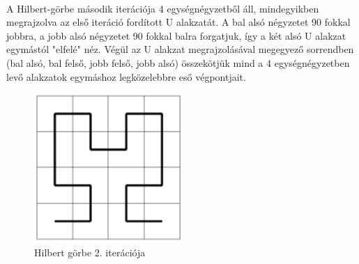 \\A Hilbert-görbe második iterációja 4 egységnégyzetből áll, mindegyikben megrajzolva az első iteráció fordított U alakzatát. A bal alsó négyzetet 90 fokkal jobbra, a jobb alsó négyzetet 90 fokkal balra forgatjuk, így a két alsó U alakzat egymástól "elfelé" néz. Végül az U alakzat megrajzolásával megegyező sorrendben (bal alsó, bal felső, jobb felső, jobb alsó) összekötjük mind a 4 egységnégyzetben levő alakzatok egymáshoz legközelebbre eső végpontjait.
\begin{figure}[!ht]
	\begin{center}
	\includegraphics[width=0.5\textwidth]{img/HilbertCurve2-1}
	\caption[labelInTOC]{Hilbert görbe 2. iterációja}
\end{center}
\end{figure}


